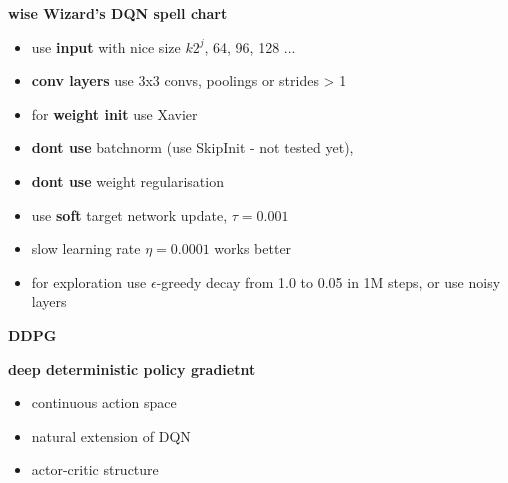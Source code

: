 \documentclass[xcolor=dvipsnames]{beamer}
\begin{document}
\begin{frame}{\bf wise Wizard's DQN spell chart}
  \begin{itemize}
    \item use {\bf \color{red} input} with nice size $k2^j$, 64, 96, 128 ...
    \item {\bf \color{red} conv layers} use 3x3 convs, poolings or strides > 1
    \item for {\bf \color{red} weight init} use Xavier
    \item {\bf \color{red} dont use} batchnorm (use SkipInit - not tested yet),
    \item {\bf \color{red} dont use} weight regularisation
    \item use {\bf \color{red} soft} target network update, $\tau = 0.001$
    \item slow learning rate $\eta = 0.0001$ works better
    \item for exploration use $\epsilon$-greedy decay from 1.0 to 0.05 in 1M steps, or use noisy layers
  \end{itemize}
\end{frame}



\begin{frame}{\bf DDPG}

  {\bf deep deterministic policy gradietnt}

  \begin{itemize}
    \item continuous action space
    \item natural extension of DQN
    \item actor-critic structure
  \end{itemize}


\end{frame}
\end{document}
